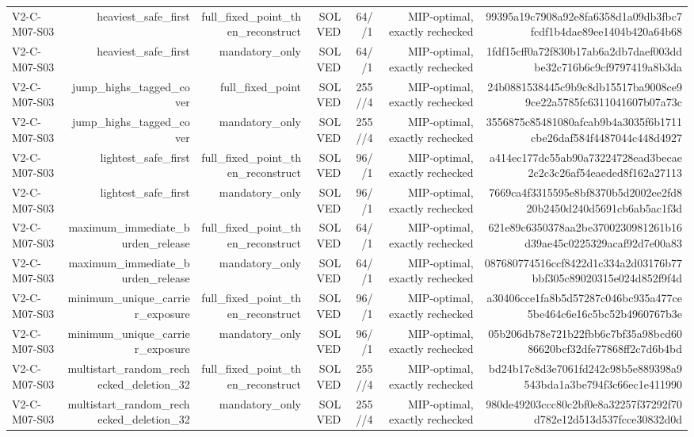 {\begin{longtable}{lrrrrrr}
V2-C-M07-S03 & heaviest\_safe\_first & full\_fixed\_point\_then\_reconstruct & SOLVED & 64//1 & MIP-optimal, exactly rechecked & 99395a19c7908a92e8fa6358d1a09db3fbc7fcdf1b4dae89ee1404b420a64b68 \\
V2-C-M07-S03 & heaviest\_safe\_first & mandatory\_only & SOLVED & 64//1 & MIP-optimal, exactly rechecked & 1fdf15cff0a72f830b17ab6a2db7daef003ddbe32c716b6c9cf9797419a8b3da \\
V2-C-M07-S03 & jump\_highs\_tagged\_cover & full\_fixed\_point & SOLVED & 255//4 & MIP-optimal, exactly rechecked & 24b0881538445c9b9c8db15517ba9008ce99ce22a5785fc6311041607b07a73c \\
V2-C-M07-S03 & jump\_highs\_tagged\_cover & mandatory\_only & SOLVED & 255//4 & MIP-optimal, exactly rechecked & 3556875c85481080afcab9b4a3035f6b1711cbe26daf584f4487044c448d4927 \\
V2-C-M07-S03 & lightest\_safe\_first & full\_fixed\_point\_then\_reconstruct & SOLVED & 96//1 & MIP-optimal, exactly rechecked & a414ec177dc55ab90a73224728ead3becae2c2c3c26af54eaeded8f162a27113 \\
V2-C-M07-S03 & lightest\_safe\_first & mandatory\_only & SOLVED & 96//1 & MIP-optimal, exactly rechecked & 7669ca4f3315595e8bf8370b5d2002ee2fd820b2450d240d5691cb6ab5ac1f3d \\
V2-C-M07-S03 & maximum\_immediate\_burden\_release & full\_fixed\_point\_then\_reconstruct & SOLVED & 64//1 & MIP-optimal, exactly rechecked & 621e89c6350378aa2be3700230981261b16d39ae45c0225329acaf92d7e00a83 \\
V2-C-M07-S03 & maximum\_immediate\_burden\_release & mandatory\_only & SOLVED & 64//1 & MIP-optimal, exactly rechecked & 087680774516ccf8422d1c334a2d03176b77bbf305c89020315e024d852f9f4d \\
V2-C-M07-S03 & minimum\_unique\_carrier\_exposure & full\_fixed\_point\_then\_reconstruct & SOLVED & 96//1 & MIP-optimal, exactly rechecked & a30406cce1fa8b5d57287c046bc935a477ce5be464c6e16c5bc52b4960767b3e \\
V2-C-M07-S03 & minimum\_unique\_carrier\_exposure & mandatory\_only & SOLVED & 96//1 & MIP-optimal, exactly rechecked & 05b206db78e721b22fbb6c7bf35a98bcd6086620bcf32dfe77868ff2c7d6b4bd \\
V2-C-M07-S03 & multistart\_random\_rechecked\_deletion\_32 & full\_fixed\_point\_then\_reconstruct & SOLVED & 255//4 & MIP-optimal, exactly rechecked & bd24b17c8d3e7061fd242c98b5e889398a9543bda1a3be794f3c66ec1e411990 \\
V2-C-M07-S03 & multistart\_random\_rechecked\_deletion\_32 & mandatory\_only & SOLVED & 255//4 & MIP-optimal, exactly rechecked & 980de49203ccc80c2bf0e8a32257f37292f70d782e12d513d537fcce30832d0d \\

\end{longtable}}

